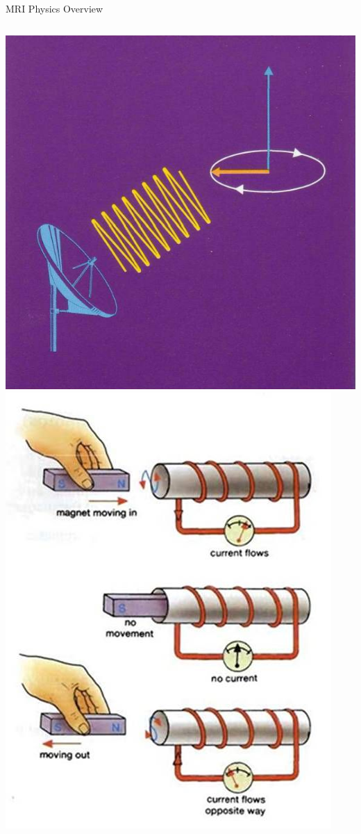 \documentclass[aspectratio=169,xcolor=dvipsnames]{beamer}
\begin{document}
\begin{frame}{MRI Physics Overview}
\begin{columns}[c]
\includegraphics[width=1\textwidth]{imgs/rfpulse3}
\includegraphics[width=.7\textwidth]{imgs/faradaylaw}
\end{columns}
\end{frame}
\end{document}
